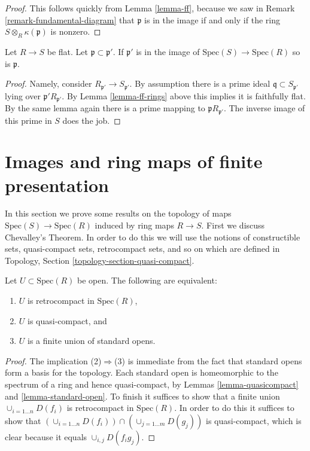 \begin{proof}
This follows quickly from Lemma \ref{lemma-ff}, because we
saw in Remark \ref{remark-fundamental-diagram}
that $\mathfrak p$ is in the image
if and only if the ring $S \otimes_R \kappa(\mathfrak p)$
is nonzero.
\end{proof}

\begin{lemma}
\label{lemma-flat-gd}
Let $R\to S$ be flat. Let $\mathfrak p \subset \mathfrak p'$.
If $\mathfrak p'$ is in the image of $\text{Spec}(S)
\to \text{Spec}(R)$ so is $\mathfrak p$.
\end{lemma}

\begin{proof}
Namely, consider $R_{\mathfrak p'} \to S_{\mathfrak p'}$.
By assumption there is a prime ideal $\mathfrak q  \subset  S_{\mathfrak p'}$
lying over $\mathfrak p' R_{\mathfrak p'}$.
By Lemma \ref{lemma-ff-rings} above this implies it is faithfully
flat. By the same lemma again there is a prime mapping to
$\mathfrak p R_{\mathfrak p'}$. The inverse image of this
prime in $S$ does the job.
\end{proof}

\section{Images and ring maps of finite presentation}
\label{section-images-finite-presentation}

\noindent
In this section we prove some results on the 
topology of maps $\text{Spec}(S) \to \text{Spec}(R)$
induced by ring maps $R \to S$. First we discuss Chevalley's Theorem.
In order to do this we will use the notions of constructible sets,
quasi-compact sets, retrocompact sets, and so on
which are defined in Topology, Section \ref{topology-section-quasi-compact}.

\begin{lemma}
\label{lemma-qc-open}
Let $U \subset \text{Spec}(R)$ be open. The following
are equivalent:
\begin{enumerate}
\item $U$ is retrocompact in $\text{Spec}(R)$,
\item $U$ is quasi-compact, and
\item $U$ is a finite union of standard opens.
\end{enumerate}
\end{lemma}

\begin{proof}
The implication (2)$\Rightarrow$(3) is immediate from the fact that standard
opens form a basis for the topology. Each standard open is
homeomorphic to the spectrum of a ring and hence quasi-compact,
by Lemmas \ref{lemma-quasicompact} and \ref{lemma-standard-open}.
To finish it suffices to show that a finite union
$\cup_{i=1\ldots n} D(f_i)$ is retrocompact in $\text{Spec}(R)$.
In order to do this it suffices to show that 
$(\cup_{i=1\ldots n} D(f_i)) \cap (\cup_{j=1\ldots m} D(g_j))$
is quasi-compact, which is clear because it equals
$\cup_{i,j} D(f_i g_j)$.
\end{proof}

